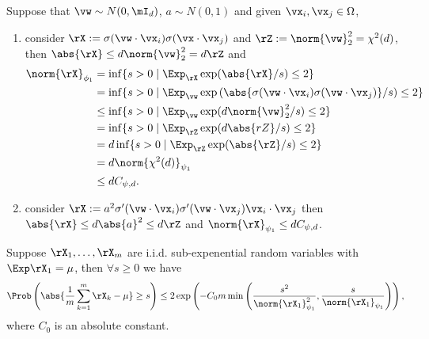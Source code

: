 \documentclass{article}
\begin{document}
\begin{rmk}
    Suppose that $\vw\sim N(0,\mI_d)$, $a\sim N(0,1)$ and given $\vx_i,\vx_j \in\Omega$,
    \begin{enumerate}
        \item consider $\rX:=\sigma(\vw\cdot\vx_i)\sigma(\vx\cdot\vx_j)$ and $\rZ:=\norm{\vw}^2_2=\chi^2(d)$, then $\abs{\rX}\leq d\norm{\vw}^2_2=d\rZ$ and
              \begin{equation}
                  \begin{aligned}
                      \norm{\rX}_{\phi_1}
                       & =\inf\{s>0\mid\Exp_{\rX}\exp(\abs{\rX}/s)\leq 2\}                                                   \\
                       & =\inf\{s>0\mid\Exp_{\vw}\exp\left(\abs{\sigma(\vw\cdot\vx_i)\sigma(\vw\cdot\vx_j)}/s\right)\leq 2\} \\
                       & \leq\inf\{s>0\mid\Exp_{\vw}\exp(d\norm{\vw}^2_2/s)\leq 2\}                                          \\
                       & =\inf\{s>0\mid\Exp_{\rZ}\exp(d\abs{rZ}/s)\leq 2\}                                                   \\
                       & =d\inf\{s>0\mid\Exp_{\rZ}\exp(\abs{\rZ}/s)\leq 2\}                                                  \\
                       & =d\norm{\chi^2(d)}_{\psi_1}                                                                         \\
                       & \leq dC_{\psi,d}.
                  \end{aligned}
              \end{equation}
        \item consider $\rX:=a^2\sigma'(\vw\cdot\vx_i)\sigma'(\vw\cdot\vx_j)\vx_i\cdot\vx_j$ then $\abs{\rX}\leq d\abs{a}^2\leq d\rZ$ and $\norm{\rX}_{\psi_1}\leq dC_{\psi,d}$.
    \end{enumerate}
\end{rmk}
\begin{thm}\label{thm:sub_exp}
    Suppose $\rX_1,\ldots,\rX_m$ are i.i.d. sub-expenential random variables with $\Exp\rX_1=\mu$, then $\forall s\geq 0$ we have
    \begin{equation}
        \Prob\left(\abs{\frac{1}{m}\sum_{k=1}^m\rX_k-\mu}\geq s\right)\leq 2\exp\left(-C_0 m \min\left(\frac{s^2}{\norm{\rX_1}^2_{\psi_1}},\frac{s}{\norm{\rX_1}_{\psi_1}}\right)\right),
    \end{equation}
    where $C_0$ is an absolute constant.
\end{thm}
\end{document}
